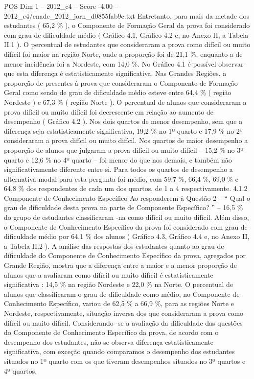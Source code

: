 \begin{textsample}{POS Dim 1 – 2012\_c4 – Score -4.00 – 2012\_c4/enade\_2012\_jorn\_d0855fab9c.txt}
Entretanto, para mais da metade dos estudantes ( 65,2 \% ), o Componente de Formação Geral da prova foi considerado com grau de dificuldade médio ( Gráfico 4.1, Gráfico 4.2 e, no Anexo II, a Tabela II.1 ).
O percentual de estudantes que consideraram a prova como difícil ou muito difícil foi maior na região Norte, onde a proporção foi de 21,1 \%, enquanto a de menor incidência foi a Nordeste, com 14,0 \%.
No Gráfico 4.1 é possível observar que esta diferença é estatisticamente significativa.
Nas Grandes Regiões, a proporção de presentes à prova que consideraram o Componente de Formação Geral como sendo de grau de dificuldade médio esteve entre 64,4 \% ( região Nordeste ) e 67,3 \% ( região Norte ).
O percentual de alunos que consideraram a prova difícil ou muito difícil foi decrescente em relação ao aumento de desempenho ( Gráfico 4.2 ).
Nos dois quartos de menor desempenho, sem que a diferença seja estatisticamente significativa, 19,2 \% no 1º quarto e 17,9 \% no 2º consideraram a prova difícil ou muito difícil.
Nos quartos de maior desempenho a proporção de alunos que julgaram a prova difícil ou muito difícil – 15,2 \% no 3º quarto e 12,6 \% no 4º quarto – foi menor do que nos demais, e também não significativamente diferente entre si.
Para todos os quartos de desempenho a alternativa modal para esta pergunta foi médio, com 59,7 \%, 66,4 \%, 69,0 \% e 64,8 \% dos respondentes de cada um dos quartos, de 1 a 4 respectivamente. 4.1.2 Componente de Conhecimento Específico Ao responderem à Questão 2 – “ Qual o grau de dificuldade desta prova na parte de Componente Específico? ” – 16,5 \% do grupo de estudantes classificaram -na como difícil ou muito difícil.
Além disso, o Componente de Conhecimento Específico da prova foi considerado com grau de dificuldade médio por 64,1 \% dos alunos ( Gráfico 4.3, Gráfico 4.4 e, no Anexo II, a Tabela II.2 ).
A análise das respostas dos estudantes quanto ao grau de dificuldade do Componente de Conhecimento Específico da prova, agregados por Grande Região, mostra que a diferença entre a maior e a menor proporção de alunos que a avaliaram como difícil ou muito difícil é estatisticamente significativa : 14,5 \% na região Nordeste e 22,0 \% na Norte.
O percentual de alunos que classificaram o grau de dificuldade como médio, no Componente de Conhecimento Específico, variou de 62,5 \% a 66,9 \%, para as regiões Norte e Nordeste, respectivamente, situação inversa dos que consideraram a prova como difícil ou muito difícil.
Considerando -se a avaliação da dificuldade das questões do Componente de Conhecimento Específico da prova, de acordo com o desempenho dos estudantes, não se observa diferença estatisticamente significativa, com exceção quando comparamos o desempenho dos estudantes situados no 1º quarto com os que tiveram desempenhos situados no 3º quartos e 4º quartos.

\end{textsample}
